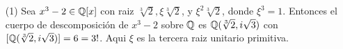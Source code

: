 \begin{example}\label{}
    \begin{enumerate}
        \item[(1)] Sea $x^3-2 \in \mathbb{Q}[x]$ con raiz $\sqrt[3]{2},
            \xi\sqrt[3]{2}$, y $\xi^2\sqrt[3]{2}$, donde  $\xi^3=1$. Entonces el
            cuerpo de descomposici\'on de $x^3-2$ sobre $\mathbb{Q}$ es
            $\mathbb{Q}(\sqrt[3]{2}, i\sqrt{3})$ con $[\mathbb{Q}(\sqrt[3]{2}, i\sqrt{3})]=6=3!$.
            Aqui $\xi$ es la tercera raiz unitario primitiva.
    \end{enumerate}
\end{example}
